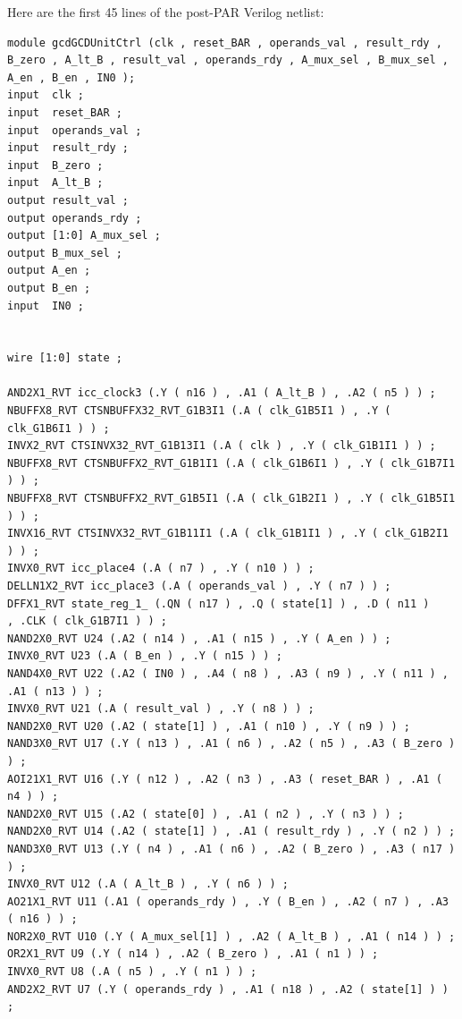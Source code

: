 \documentclass[11pt]{article}
\begin{document}
Here are the first 45 lines of the post-PAR Verilog netlist:
\begin{verbatim}
module gcdGCDUnitCtrl (clk , reset_BAR , operands_val , result_rdy , 
B_zero , A_lt_B , result_val , operands_rdy , A_mux_sel , B_mux_sel , 
A_en , B_en , IN0 );
input  clk ;
input  reset_BAR ;
input  operands_val ;
input  result_rdy ;
input  B_zero ;
input  A_lt_B ;
output result_val ;
output operands_rdy ;
output [1:0] A_mux_sel ;
output B_mux_sel ;
output A_en ;
output B_en ;
input  IN0 ;


wire [1:0] state ;

AND2X1_RVT icc_clock3 (.Y ( n16 ) , .A1 ( A_lt_B ) , .A2 ( n5 ) ) ;
NBUFFX8_RVT CTSNBUFFX32_RVT_G1B3I1 (.A ( clk_G1B5I1 ) , .Y ( clk_G1B6I1 ) ) ;
INVX2_RVT CTSINVX32_RVT_G1B13I1 (.A ( clk ) , .Y ( clk_G1B1I1 ) ) ;
NBUFFX8_RVT CTSNBUFFX2_RVT_G1B1I1 (.A ( clk_G1B6I1 ) , .Y ( clk_G1B7I1 ) ) ;
NBUFFX8_RVT CTSNBUFFX2_RVT_G1B5I1 (.A ( clk_G1B2I1 ) , .Y ( clk_G1B5I1 ) ) ;
INVX16_RVT CTSINVX32_RVT_G1B11I1 (.A ( clk_G1B1I1 ) , .Y ( clk_G1B2I1 ) ) ;
INVX0_RVT icc_place4 (.A ( n7 ) , .Y ( n10 ) ) ;
DELLN1X2_RVT icc_place3 (.A ( operands_val ) , .Y ( n7 ) ) ;
DFFX1_RVT state_reg_1_ (.QN ( n17 ) , .Q ( state[1] ) , .D ( n11 ) 
, .CLK ( clk_G1B7I1 ) ) ;
NAND2X0_RVT U24 (.A2 ( n14 ) , .A1 ( n15 ) , .Y ( A_en ) ) ;
INVX0_RVT U23 (.A ( B_en ) , .Y ( n15 ) ) ;
NAND4X0_RVT U22 (.A2 ( IN0 ) , .A4 ( n8 ) , .A3 ( n9 ) , .Y ( n11 ) , .A1 ( n13 ) ) ;
INVX0_RVT U21 (.A ( result_val ) , .Y ( n8 ) ) ;
NAND2X0_RVT U20 (.A2 ( state[1] ) , .A1 ( n10 ) , .Y ( n9 ) ) ;
NAND3X0_RVT U17 (.Y ( n13 ) , .A1 ( n6 ) , .A2 ( n5 ) , .A3 ( B_zero ) ) ;
AOI21X1_RVT U16 (.Y ( n12 ) , .A2 ( n3 ) , .A3 ( reset_BAR ) , .A1 ( n4 ) ) ;
NAND2X0_RVT U15 (.A2 ( state[0] ) , .A1 ( n2 ) , .Y ( n3 ) ) ;
NAND2X0_RVT U14 (.A2 ( state[1] ) , .A1 ( result_rdy ) , .Y ( n2 ) ) ;
NAND3X0_RVT U13 (.Y ( n4 ) , .A1 ( n6 ) , .A2 ( B_zero ) , .A3 ( n17 ) ) ;
INVX0_RVT U12 (.A ( A_lt_B ) , .Y ( n6 ) ) ;
AO21X1_RVT U11 (.A1 ( operands_rdy ) , .Y ( B_en ) , .A2 ( n7 ) , .A3 ( n16 ) ) ;
NOR2X0_RVT U10 (.Y ( A_mux_sel[1] ) , .A2 ( A_lt_B ) , .A1 ( n14 ) ) ;
OR2X1_RVT U9 (.Y ( n14 ) , .A2 ( B_zero ) , .A1 ( n1 ) ) ;
INVX0_RVT U8 (.A ( n5 ) , .Y ( n1 ) ) ;
AND2X2_RVT U7 (.Y ( operands_rdy ) , .A1 ( n18 ) , .A2 ( state[1] ) ) ;
\end{verbatim}
\end{document}
